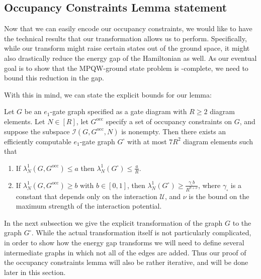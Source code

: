 \documentclass[../thesis-main/thesis-main]{subfiles}
\begin{document}
\subsection{Occupancy Constraints Lemma statement}
\label{sec:occupancy_statement}

Now that we can easily encode our occupancy constraints, we would like to have the technical results that our transformation allows us to perform.  Specifically, while our transform might raise certain states out of the ground space, it might also drastically reduce the energy gap of the Hamiltonian as well.  As our eventual goal is to show that the MPQW-ground state problem is \QMA-complete, we need to bound this reduction in the gap.  


With this in mind, we can state the explicit bounds for our lemma:
\begin{lemma}\label{lem:oc}
Let $G$ be an $e_{1}$-gate graph specified as a gate diagram with $R\geq2$ diagram elements. Let $N\in[R]$, let $G^{\text{occ}}$ specify a set of occupancy constraints on $G$, and suppose the subspace $\mathcal{I}(G,G^{\text{occ}},N)$ is nonempty. Then there exists an efficiently computable $e_{1}$-gate graph $G^{\square}$ with at most $7R^{2}$ diagram elements such that
\begin{enumerate}
\item If $\lambda_{N}^{1}(G,G^{\text{occ}})\leq a$ then $\lambda_{N}^{1}(G^{\square})\leq\frac{a}{R}$.
\item If $\lambda_{N}^{1}(G,G^{\text{occ}})\geq b$ with $b\in[0,1]$, then $\lambda_{N}^{1}(G^{\square})\geq \frac{\gamma_{\square}b}{R^{9+\nu}}$, where $\gamma_{\square}$ is a constant that depends only on the interaction $\mathcal{U}$, and $\nu$ is the bound on the maximum strength of the interaction potential.
\end{enumerate}
\end{lemma}

In the next subsection we give the explicit transformation of the graph $G$ to the graph $G^{\square}$. While the actual transformation itself is not particularly complicated, in order to show how the energy gap transforms we will need to define several intermediate graphs in which not all of the edges are added.  Thus our proof of the occupancy constraints lemma will also be rather iterative, and will be done later in this section.
\end{document}
